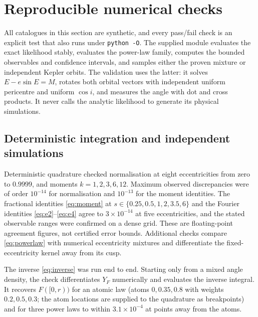 \documentclass[11pt,a4paper]{article}
\theoremstyle{remark}\newtheorem{remark}[theorem]{Remark}
\begin{document}
\section{Reproducible numerical checks}\label{sec:numerics}

All catalogues in this section are synthetic, and every pass/fail check is an explicit test that also runs under \texttt{python -O}. The supplied module evaluates the exact likelihood stably, evaluates the power-law family, computes the bounded observables and confidence intervals, and samples either the proven mixture or independent Kepler orbits. The validation uses the latter: it solves $E-e\sin E=M$, rotates both orbital vectors with independent uniform pericentre and uniform $\cos i$, and measures the angle with dot and cross products. It never calls the analytic likelihood to generate its physical simulations.

\subsection{Deterministic integration and independent simulations}

Deterministic quadrature checked normalisation at eight eccentricities from zero to $0.9999$, and moments $k=1,2,3,6,12$. Maximum observed discrepancies were of order $10^{-14}$ for normalisation and $10^{-13}$ for the moment identities. The fractional identities \eqref{eq:moment} at $s\in\{0.25,0.5,1,2,3.5,6\}$ and the Fourier identities \eqref{eq:e2}--\eqref{eq:e4} agree to $3\times10^{-14}$ at five eccentricities, and the stated observable ranges were confirmed on a dense grid. These are floating-point agreement figures, not certified error bounds. Additional checks compare \eqref{eq:powerlaw} with numerical eccentricity mixtures and differentiate the fixed-eccentricity kernel away from its cusp.

The inverse \eqref{eq:inverse} was run end to end. Starting only from a mixed angle density, the check differentiates $Y_F$ numerically and evaluates the inverse integral. It recovers $F([0,r))$ for an atomic law (atoms $0,0.35,0.8$ with weights $0.2,0.5,0.3$; the atom locations are supplied to the quadrature as breakpoints) and for three power laws to within $3.1\times10^{-4}$ at points away from the atoms.
\end{document}
